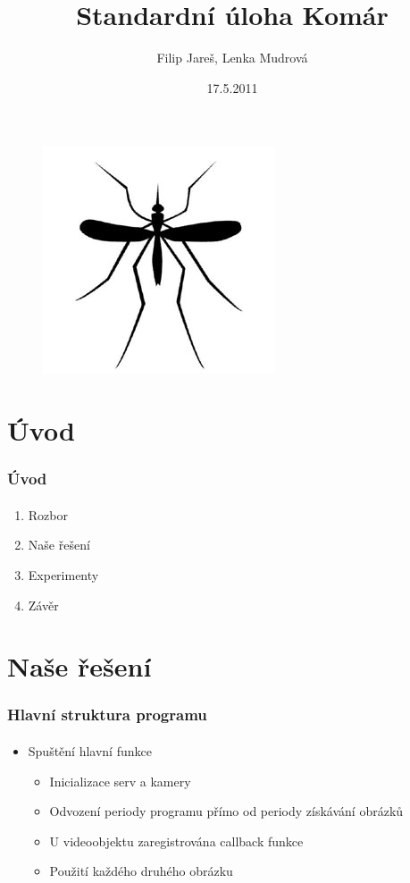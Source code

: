 \documentclass{beamer}
\author{Filip Jareš, Lenka Mudrová}
\title{Standardní úloha Komár}
\institute{České Vysoké Učení Technické v Praze\\ Fakulta Elektrotechnická}
\date{17.5.2011}
\begin{document}
\begin{frame}
        \titlepage
        \begin{center}
         \begin{figure}[!h]
	\centering
	\includegraphics[width=0.2\columnwidth]{pics/mosquito}
\end{figure}
        \end{center}

\end{frame}

\section{Úvod}
\begin{frame}
\frametitle{Úvod}
 \framesubtitle{}
\begin{enumerate}
 \item Rozbor
 \item Naše řešení
 \item Experimenty
 \item Závěr
\end{enumerate}

\end{frame}

\section{Naše řešení}
\begin{frame}
\frametitle{Hlavní struktura programu}
 \framesubtitle{}
 \begin{itemize}
  \item Spuštění hlavní funkce
  \begin{itemize}
   \item Inicializace serv a kamery
   \item Odvození periody programu přímo od periody získávání obrázků
   \item U videoobjektu zaregistrována callback funkce
   \item Použití každého druhého obrázku
  \end{itemize}

 \end{itemize}
\end{frame}
\end{document}
